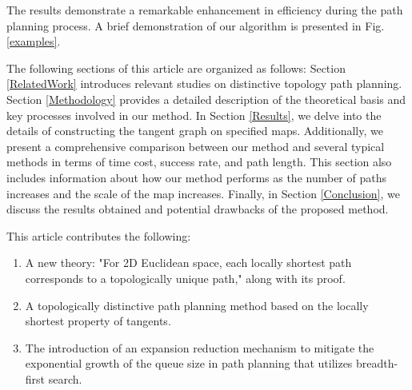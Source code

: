 \documentclass[letterpaper, 10 pt, journal, twoside]{IEEEtran}
\begin{document}
The results demonstrate a remarkable enhancement in efficiency during the path planning process. A brief demonstration of our algorithm is presented in Fig. \ref{examples}.



The following sections of this article are organized as follows: Section \ref{RelatedWork} introduces relevant studies on distinctive topology path planning. Section \ref{Methodology} provides a detailed description of the theoretical basis and key processes involved in our method. In Section \ref{Results}, we delve into the details of constructing the tangent graph on specified maps. Additionally, we present a comprehensive comparison between our method and several typical methods in terms of time cost, success rate, and path length. This section also includes information about how our method performs as the number of paths increases and the scale of the map increases. Finally, in Section \ref{Conclusion}, we discuss the results obtained and potential drawbacks of the proposed method.

This article contributes the following:

\begin{enumerate}
    \item A new theory: "For 2D Euclidean space, each locally shortest path corresponds to a topologically unique path," along with its proof.
    \item A topologically distinctive path planning method based on the locally shortest property of tangents.
    \item The introduction of an expansion reduction mechanism to mitigate the exponential growth of the queue size in path planning that utilizes breadth-first search.
\end{enumerate}
\end{document}
